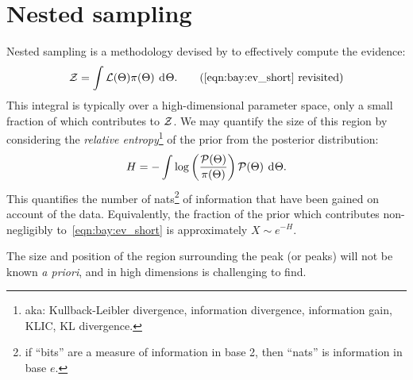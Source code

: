 \section{Nested sampling}
\label{sec:bay:nested_sampling}
%
Nested sampling is a methodology devised by \citet{skilling2006} to effectively compute the evidence:
\begin{equation}
  \ev = \int \lik(\params) \prior(\params) \: \d{\params}.
  \tag{\ref{eqn:bay:ev_short} revisited}
\end{equation}
This integral is typically over a high-dimensional parameter space, only a small fraction of which contributes to \(\mathcal{Z}\). We may quantify the size of this region by considering the {\em relative entropy\/}\footnote{aka: Kullback-Leibler divergence, information divergence, information gain, KLIC, KL divergence.} of the prior from the posterior distribution:
\begin{equation}
  H = -\int \log\left( \frac{\mathcal{P}(\Theta)}{\pi(\Theta)}\right) \mathcal{P}(\Theta)\: \operatorname{d}^{}\!{\Theta}.
  \label{eqn:bay:rel_ent}
\end{equation}  
This quantifies the number of nats\footnote{if ``bits'' are a measure of information in base 2, then ``nats'' is information in base \(e\).} of information that have been gained on account of the data. Equivalently, the fraction of the prior which contributes non-negligibly to~\eqref{eqn:bay:ev_short} is approximately \(X\sim e^{-H}\).

The size and position of the region surrounding the peak (or peaks) will not be known {\em a priori}, and in high dimensions is challenging to find.  

